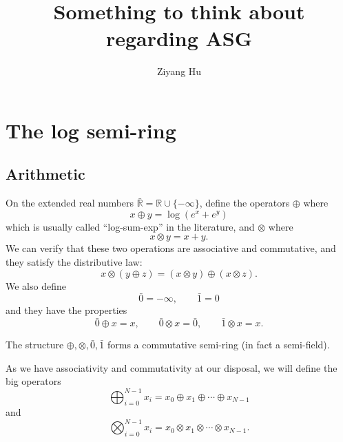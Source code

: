 \documentclass[a4paper]{article}
\title{Something to think about regarding ASG}
\author{Ziyang Hu}
\begin{document}
\maketitle
\tableofcontents
\newpage
\section{The log semi-ring}

\subsection{Arithmetic}

On the extended real numbers $\bar{\mathbb{R}}=\mathbb{R}\cup \{-\infty\}$, define the operators $\oplus$ where
\begin{equation}
x \oplus y = \log(e^x+e^y)
\end{equation}
which is usually called ``log-sum-exp'' in the literature, and $\otimes$ where
\begin{equation}
x \otimes y = x + y.
\end{equation}
We can verify that these two operations are associative and commutative, and they satisfy the distributive law:
\begin{equation}
x\otimes(y\oplus z) = (x\otimes y)\oplus(x\otimes z).
\end{equation}
We also define
\begin{equation}
\bar{0} = -\infty, \qquad \bar{1} = 0
\end{equation}
and they have the properties
\begin{equation}
\bar{0}\oplus x = x, \qquad \bar{0}\otimes x = \bar{0}, \qquad \bar{1}\otimes x = x.
\end{equation}

The structure $\oplus, \otimes, \bar{0}, \bar{1}$ forms a commutative semi-ring (in fact a semi-field).

As we have associativity and commutativity at our disposal, we will define the big operators
\begin{equation}
\bigoplus_{i=0}^{N-1} x_i = x_0 \oplus x_1 \oplus \cdots \oplus x_{N-1}
\end{equation}
and
\begin{equation}
\bigotimes_{i=0}^{N-1} x_i = x_0 \otimes x_1 \otimes \cdots \otimes x_{N-1}.
\end{equation}
\end{document}
